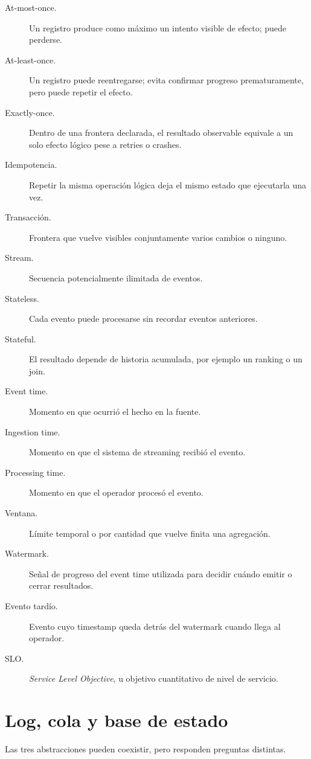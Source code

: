 \documentclass[variant=apuntes,cover=institutional,mode=screen]{ua-engineering-v6-article}
\begin{document}
\begin{description}
\item[At-most-once.] Un registro produce como máximo un intento visible de efecto; puede perderse.
\item[At-least-once.] Un registro puede reentregarse; evita confirmar progreso prematuramente, pero puede repetir el efecto.
\item[Exactly-once.] Dentro de una frontera declarada, el resultado observable equivale a un solo efecto lógico pese a retries o crashes.
\item[Idempotencia.] Repetir la misma operación lógica deja el mismo estado que ejecutarla una vez.
\item[Transacción.] Frontera que vuelve visibles conjuntamente varios cambios o ninguno.
\item[Stream.] Secuencia potencialmente ilimitada de eventos.
\item[Stateless.] Cada evento puede procesarse sin recordar eventos anteriores.
\item[Stateful.] El resultado depende de historia acumulada, por ejemplo un ranking o un join.
\item[Event time.] Momento en que ocurrió el hecho en la fuente.
\item[Ingestion time.] Momento en que el sistema de streaming recibió el evento.
\item[Processing time.] Momento en que el operador procesó el evento.
\item[Ventana.] Límite temporal o por cantidad que vuelve finita una agregación.
\item[Watermark.] Señal de progreso del event time utilizada para decidir cuándo emitir o cerrar resultados.
\item[Evento tardío.] Evento cuyo timestamp queda detrás del watermark cuando llega al operador.
\item[SLO.] \emph{Service Level Objective}, u objetivo cuantitativo de nivel de servicio.
\end{description}

\section{Log, cola y base de estado}

Las tres abstracciones pueden coexistir, pero responden preguntas distintas.
\end{document}
